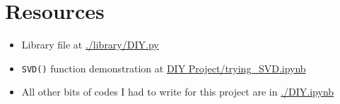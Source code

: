 \section{Resources}
	\begin{itemize}
		\item Library file at \href{https://github.com/PeithonKing/comp_phys_P346/blob/main/library/DIY.py}{.\slash library\slash DIY.py}
		\item \texttt{SVD()} function demonstration at \href{https://github.com/PeithonKing/comp_phys_P346/blob/main/DIY%20Project/trying_SVD.ipynb}{DIY Project\slash trying\_SVD.ipynb}
		\item All other bits of codes I had to write for this project are in \href{https://github.com/PeithonKing/comp_phys_P346/blob/main/DIY.ipynb}{.\slash DIY.ipynb}
	\end{itemize}